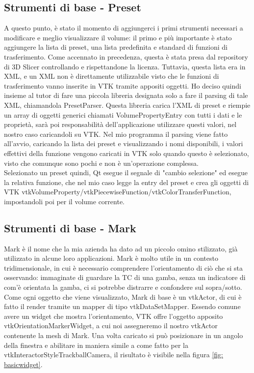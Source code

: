\subsection{Strumenti di base - Preset}
A questo punto, è stato il momento di aggiungerci i primi strumenti necessari a modificare e meglio visualizzare il volume: il primo e più importante è stato aggiungere la lista di preset, una lista predefinita e standard di funzioni di trasferimento. Come accennato in precedenza, questa è stata presa dal repository di 3D Slicer controllando e rispettandone la licenza. Tuttavia, questa lista era in XML, e un XML non è direttamente utilizzabile visto che le funzioni di trasferimento vanno inserite in VTK tramite appositi oggetti. Ho deciso quindi insieme al tutor di fare una piccola libreria designata solo a fare il parsing di tale XML, chiamandola PresetParser. Questa libreria carica l'XML di preset e riempie un array di oggetti generici chiamati VolumePropertyEntry con tutti i dati e le proprietà, sarà poi responsabilità dell'applicazione utilizzare questi valori, nel nostro caso caricandoli su VTK. Nel mio programma il parsing viene fatto all'avvio, caricando la lista dei preset e visualizzando i nomi disponibili, i valori effettivi della funzione vengono caricati in VTK solo quando questo è selezionato, visto che comunque sono pochi e non è un'operazione complessa.
\\
Selezionato un preset quindi, Qt esegue il segnale di "cambio selezione" ed esegue la relativa funzione, che nel mio caso legge la entry del preset e crea gli oggetti di VTK vtkVolumeProperty/vtkPiecewiseFunction/vtkColorTransferFunction, impostandoli poi per il volume corrente.

\subsection{Strumenti di base - Mark}
Mark è il nome che la mia azienda ha dato ad un piccolo omino stilizzato, già utilizzato in alcune loro applicazioni. Mark è molto utile in un contesto tridimensionale, in cui è necessario comprendere l'orientamento di ciò che si sta osservando: immaginate di guardare la TC di una gamba, senza un indicatore di com'è orientata la gamba, ci si potrebbe distrarre e confondere sul sopra/sotto. Come ogni oggetto che viene visualizzato, Mark di base è un vtkActor, di cui è fatto il render tramite un mapper di tipo vtkDataSetMapper. Essendo comune avere un widget che mostra l'orientamento, VTK offre l'oggetto apposito vtkOrientationMarkerWidget, a cui noi assegneremo il nostro vtkActor contenente la mesh di Mark. Una volta caricato si può posizionare in un angolo della finestra e abilitare in maniera simile a come fatto per la vtkInteractorStyleTrackballCamera, il risultato è visibile nella figura \ref{fig: basicwidget}.

